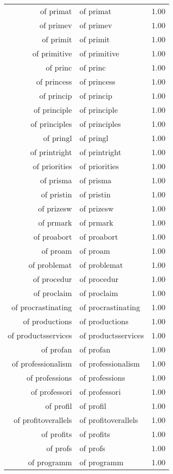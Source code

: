 \begin{table}[ht]
\begin{tabular}{rlr}
  of primat & of primat & 1.00 \\ 
  of primev & of primev & 1.00 \\ 
  of primit & of primit & 1.00 \\ 
  of primitive & of primitive & 1.00 \\ 
  of princ & of princ & 1.00 \\ 
  of princess & of princess & 1.00 \\ 
  of princip & of princip & 1.00 \\ 
  of principle & of principle & 1.00 \\ 
  of principles & of principles & 1.00 \\ 
  of pringl & of pringl & 1.00 \\ 
  of printright & of printright & 1.00 \\ 
  of priorities & of priorities & 1.00 \\ 
  of prisma & of prisma & 1.00 \\ 
  of pristin & of pristin & 1.00 \\ 
  of prizesw & of prizesw & 1.00 \\ 
  of prmark & of prmark & 1.00 \\ 
  of proabort & of proabort & 1.00 \\ 
  of proam & of proam & 1.00 \\ 
  of problemat & of problemat & 1.00 \\ 
  of procedur & of procedur & 1.00 \\ 
  of proclaim & of proclaim & 1.00 \\ 
  of procrastinating & of procrastinating & 1.00 \\ 
  of productions & of productions & 1.00 \\ 
  of productsservices & of productsservices & 1.00 \\ 
  of profan & of profan & 1.00 \\ 
  of professionalism & of professionalism & 1.00 \\ 
  of professions & of professions & 1.00 \\ 
  of professori & of professori & 1.00 \\ 
  of profil & of profil & 1.00 \\ 
  of profitoverallels & of profitoverallels & 1.00 \\ 
  of profits & of profits & 1.00 \\ 
  of profs & of profs & 1.00 \\ 
  of programm & of programm & 1.00 \\ 

\end{tabular}
\end{table}
